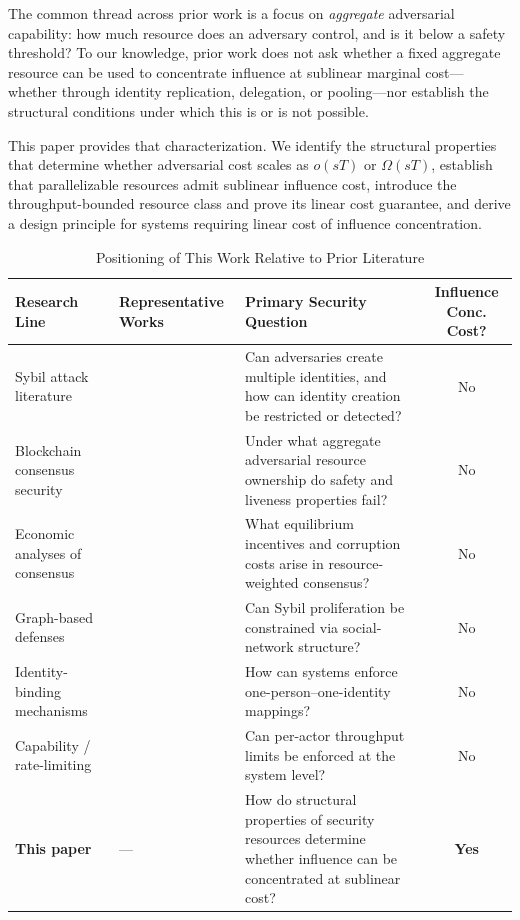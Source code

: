 \documentclass[manuscript,review]{acmart}
\theoremstyle{remark}
\begin{document}
	The common thread across prior work is a focus on
	\emph{aggregate} adversarial capability: how much
	resource does an adversary control, and is it below
	a safety threshold?
	To our knowledge, prior work does not ask whether a
	fixed aggregate resource can be used to concentrate
	influence at sublinear marginal cost---whether through
	identity replication, delegation, or pooling---nor
	establish the structural conditions under which this
	is or is not possible.
	
	This paper provides that characterization.
	We identify the structural properties that determine
	whether adversarial cost scales as $o(sT)$ or
	$\Omega(sT)$, establish that parallelizable resources admit
	sublinear influence cost, introduce the throughput-bounded
	resource class and prove its linear cost guarantee,
	and derive a design principle for systems requiring
	linear cost of influence concentration.
	
	\begin{table}[htbp]
		\caption{Positioning of This Work Relative to Prior Literature}
		\label{tab:positioning}
		\renewcommand{\arraystretch}{1.4}
		\begin{tabularx}{\linewidth}{@{}p{2.8cm}Xp{3.8cm}c@{}}
			\toprule
			\textbf{Research Line} & \textbf{Representative Works} & \textbf{Primary Security Question} & \textbf{Influence Conc. Cost?} \\
			\midrule
			Sybil attack literature
			& \cite{douceur2002sybil,yu2006sybilguard,yu2008sybillimit,danezis2009sybilinfer}
			& Can adversaries create multiple identities, and how can identity creation be restricted or detected?
			& No \\[4pt]
			Blockchain consensus security
			& \cite{lamport1982byzantine,castro1999pbft,garay2015backbone,ren2019nakamoto,kiayias2017ouroboros,gilad2017algorand}
			& Under what aggregate adversarial resource ownership do safety and liveness properties fail?
			& No \\[4pt]
			Economic analyses of consensus
			& \cite{budish2018economic,budish2024economic,kroll2013economics}
			& What equilibrium incentives and corruption costs arise in resource-weighted consensus?
			& No \\[4pt]
			Graph-based defenses
			& \cite{yu2006sybilguard,yu2008sybillimit,danezis2009sybilinfer}
			& Can Sybil proliferation be constrained via social-network structure?
			& No \\[4pt]
			Identity-binding mechanisms
			& \cite{borge2017pop,ford2020pseudonym}
			& How can systems enforce one-person--one-identity mappings?
			& No \\[4pt]
			Capability / rate-limiting
			& \cite{costan2016intel,levy1984capability,jacobson1988congestion}
			& Can per-actor throughput limits be enforced at the system level?
			& No \\
			\midrule
			\textbf{This paper}
			& ---
			& How do structural properties of security resources determine whether influence can be concentrated at sublinear cost?
			& \textbf{Yes} \\
			\bottomrule
		\end{tabularx}
	\end{table}
	
\end{document}
